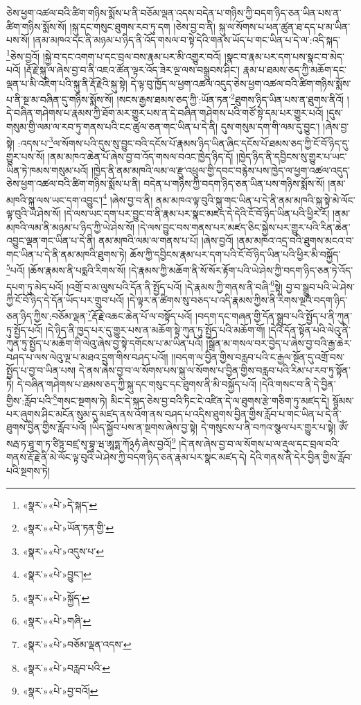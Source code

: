ཅེས་ཕྱག་འཚལ་བའི་ཚིག་གཉིས་སྨོས་པ་ནི་བཅོམ་ལྡན་འདས་བདེན་པ་གཉིས་ཀྱི་བདག་ཉིད་ཅན་ཡིན་པས་ན་ཚིག་གཉིས་སྨོས་སོ། །སྐུ་དང་གསུང་ཐུགས་རབ་ཏུ་དག །ཅེས་བྱ་བ་ནི། སྐུ་ལ་སོགས་པ་ཕན་ཚུན་ཐ་དད་པ་མ་ཡིན་པས་སོ། །ནམ་མཁའ་དང་ནི་མཉམ་པ་ཉིད་ནི་འོད་གསལ་བ་སྟེ་དེའི་གནས་ཡོད་པ་གང་ཡིན་པ་དེ་ལ་:འདི་སྐད་\footnote{«སྣར་»«པེ་»དེ་སྐད་}ཅེས་བྱའོ། །སྐྱེ་བ་དང་འགག་པ་དང་བྲལ་བས་རྣམ་པར་མི་འགྱུར་བའོ། །སྣང་བ་རྣམ་པར་དག་པས་སྣང་བ་མེད་པའོ། །རྡོ་རྗེ་སྐུ་ལ་ཞེས་བྱ་བ་ནི་འཇའ་ཚོན་ལྟར་འོད་ཟེར་ལྔ་ལས་བསྒྲུབས་ཤིང་། རྣམ་པ་ཐམས་ཅད་ཀྱི་མཆོག་དང་ལྡན་པ་མི་འཇིག་པའི་སྐུ་ནི་རྡོ་རྗེའི་སྐུ་སྟེ། དེ་ལྟ་བུ་ཁྱོད་ལ་ཕྱག་འཚལ་འདུད་ཅེས་ཕྱག་འཚལ་བའི་ཚིག་གཉིས་སྨོས་པ་ནི་སྔ་མ་བཞིན་དུ་གཉིས་སྨོས་སོ། །སངས་རྒྱས་ཐམས་ཅད་ཀྱི་:ཡོན་ཏན་\footnote{«སྣར་»«པེ་»ཡོན་ཏན་གྱི་}ཐུགས་ཉིད་ཡིན་པས་ན་ཐུགས་ནིའོ། །
དེ་བཞིན་གཤེགས་པ་རྣམས་ཀྱི་ཐོག་མར་གྱུར་པས་ན་དེ་བཞིན་གཤེགས་པའི་གཙོ་སྟེ་དམ་པར་གྱུར་པའོ། །དུས་གསུམ་གྱི་ལམ་ལ་རབ་ཏུ་གནས་པའི་ངང་ཚུལ་ཅན་གང་ཡིན་པ་དེ་ནི། དུས་གསུམ་དག་གི་ལམ་དུ་བྱུང་། །ཞེས་བྱ་སྟེ། :འདས་པ་\footnote{«སྣར་»«པེ་»འདུས་པ་}ལ་སོགས་པའི་དུས་སུ་བྱུང་བའི་དངོས་པོ་རྣམས་ཉིད་ཡིན་ཞིང་དངོས་པོ་ཐམས་ཅད་ཀྱི་ངོ་བོ་ཉིད་དུ་གྱུར་པས་སོ། །ནམ་མཁའ་ཆེན་པོ་ཞེས་བྱ་བ་འོད་གསལ་བའང་ཁྱེད་ཉིད་དོ། །ཁྱེད་ཉིད་ནི་དབྱིངས་སུ་གྱུར་པ་ཡང་ཡིན་ཏེ་ཁམས་གསུམ་པའོ། །ཁྱེད་ནི་ནམ་མཁའི་ལམ་ལ་རྫུ་འཕྲུལ་གྱི་དབང་བརྙེས་པས་ཁྱེད་ལ་ཕྱག་འཚལ་འདུད་ཅེས་ཕྱག་འཚལ་བའི་ཚིག་གཉིས་སྨོས་པ་ནི། བདེན་པ་གཉིས་ཀྱི་བདག་ཉིད་ཅན་ཡིན་པས་གཉིས་སྨོས་སོ། །ནམ་མཁའི་སྐུ་ལས་ཡང་དག་འབྱུང་།\footnote{«སྣར་»«པེ་»བྱུང་།} །ཞེས་བྱ་བ་ནི། ནམ་མཁའ་ལྟ་བུའི་སྐུ་གང་ཡིན་པ་དེ་ནི་ནམ་མཁའི་སྐུ་སྟེ་མེ་ལོང་ལྟ་བུའི་ཡེ་ཤེས་སོ། །དེ་ལས་ཡང་དག་པར་བྱུང་བ་ནི་རྣམ་པར་སྣང་མཛད་དེ་དེའི་ངོ་བོ་ཉིད་ཡིན་པའི་ཕྱིར་རོ། །ནམ་མཁའི་ལམ་ནི་མཉམ་པ་ཉིད་ཀྱི་ཡེ་ཤེས་སོ། །དེ་ལས་བྱུང་བས་གནས་པར་མཛད་ཅིང་སྐྱེས་པར་གྱུར་པའི་རིན་ཆེན་འབྱུང་ལྡན་གང་ཡིན་པ་དེ་ནི། ནམ་མཁའི་ལམ་ལ་གནས་པ་པོ། །ཞེས་བྱའོ། །ནམ་མཁའ་འདྲ་བའི་ཐུགས་མངའ་བ་གང་ཡིན་པ་དེ་ནི་ནམ་མཁའི་ཐུགས་ཏེ། ཆོས་ཀྱི་དབྱིངས་རྣམ་པར་དག་པའི་ངོ་བོ་ཉིད་ཡིན་པའི་ཕྱིར་མི་བསྐྱོད་\footnote{«སྣར་»«པེ་»སྐྱོད་}པའོ། །ཆོས་རྣམས་ནི་པདྨའི་རིགས་སོ། །དེ་རྣམས་ཀྱི་མཆོག་ནི་སོ་སོར་རྟོག་པའི་ཡེ་ཤེས་ཀྱི་བདག་ཉིད་ཅན་ཏེ་འོད་དཔག་ཏུ་མེད་པའོ། །འགྲོ་བ་མ་ལུས་པའི་དོན་ནི་སྤྱོད་པའོ། །དེ་རྣམས་ཀྱི་གནས་ནི་བཞི་\footnote{«སྣར་»«པེ་»གཞི་}སྟེ། བྱ་བ་སྒྲུབ་པའི་ཡེ་ཤེས་ཀྱི་ངོ་བོ་ཉིད་དེ་དོན་ཡོད་པར་གྲུབ་པའོ། །དེ་ལྟར་ན་ཚིགས་སུ་བཅད་པ་འདི་རྣམས་ཀྱིས་ནི་རིགས་ལྔའི་བདག་ཉིད་ཅན་ཉིད་ཀྱིས་:བཅོམ་ལྡན་\footnote{«སྣར་»«པེ་»བཅོམ་ལྡན་འདས་}རྡོ་རྗེ་འཆང་ཆེན་པོ་ལ་བསྟོད་པའོ། །བདག་དང་གཞན་གྱི་དོན་སྒྲུབ་པའི་སྤྱོད་པ་ནི་ཀུན་ཏུ་སྤྱོད་པའོ། །དེ་ཉིད་ནི་ཁྱད་པར་དུ་གྱུར་པས་ན་མཆོག་སྟེ་ཀུན་ཏུ་སྤྱོད་པའི་མཆོག་གོ། །དེའི་དོན་སྟོན་པའི་ལེའུ་ནི་ཀུན་ཏུ་སྤྱོད་པ་མཆོག་གི་ལེའུ་ཞེས་བྱ་སྟེ་དགོངས་པ་མ་ཡིན་པའོ། །སྒྲོན་མ་གསལ་བར་བྱེད་པ་ཞེས་བྱ་བའི་རྒྱ་ཆེར་བཤད་པ་ལས་ལེའུ་ལྔ་པ་མཐའ་དྲུག་གིས་བཤད་པའོ།། །།བདག་ལ་བྱིན་གྱིས་བརླབ་པའི་ང་རྒྱལ་སྔོན་དུ་འགྲོ་བས་སྤྱོད་པ་བྱ་བ་ཡིན་པས། དེ་ནས་ཞེས་བྱ་བ་ལ་སོགས་པས་སྐུ་ལ་སོགས་པ་བྱིན་གྱིས་བརླབ་པའི་རིམ་པ་རབ་ཏུ་སྟོན་ཏེ། དེ་བཞིན་གཤེགས་པ་ཐམས་ཅད་ཀྱི་སྐུ་དང་གསུང་དང་ཐུགས་ནི་མི་བསྐྱོད་པའོ། །དེའི་གསང་བ་ནི་དེ་བྱིན་གྱིས་:རློབ་པའི་\footnote{«སྣར་»«པེ་»བརླབ་པའི་}གསང་སྔགས་ཏེ། མིང་དེ་སྐད་ཅེས་བྱ་བའི་ཏིང་ངེ་འཛིན་དེ་ལ་ཐུགས་རྩེ་གཅིག་ཏུ་མཛད་དེ། སྙོམས་པར་ཞུགས་ཤིང་མངོན་སུམ་དུ་མཛད་ནས་འོག་ནས་བཤད་པ་འདིས་ཐུགས་བྱིན་གྱིས་རློབ་པ་གང་ཡིན་པ་དེ་ནི་ཐུགས་བྱིན་གྱིས་རློབ་པའོ། །ཡིད་སྐྱོབ་པས་ན་སྔགས་ཞེས་བྱ་སྟེ། དེ་གསུངས་པ་ནི་བཀའ་སྩལ་པར་གྱུར་པ་སྟེ། ཨོཾ་སརྦ་ཏ་ཐཱ་ག་ཏ་ཙིཏྟ་བཛྲ་སྭ་བྷཱ་ཝ་ཨཱཏྨ་ཀོ྅ཧཾ་ཞེས་བྱའོ།\footnote{«སྣར་»«པེ་»བྱ་བའོ།} །དེ་ནས་ཞེས་བྱ་བ་ལ་སོགས་པ་ལ་རྡུལ་དང་བྲལ་བའི་གནས་རྡོ་རྗེ་ནི་མེ་ལོང་ལྟ་བུའི་ཡེ་ཤེས་ཀྱི་བདག་ཉིད་ཅན་རྣམ་པར་སྣང་མཛད་དེ། དེའི་གནས་ནི་དེར་བྱིན་གྱིས་རློབ་པའི་སྔགས་ཏེ། 